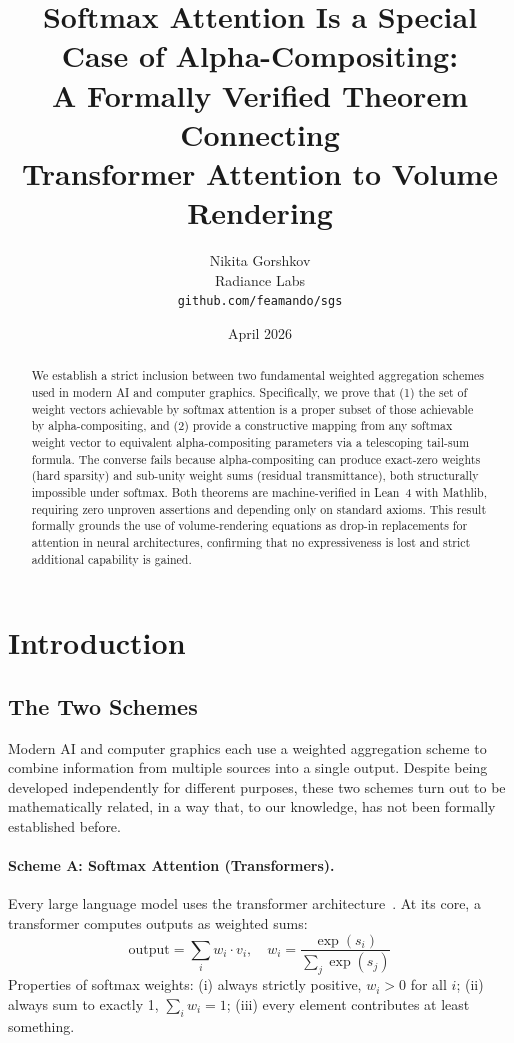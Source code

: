 \documentclass[11pt]{article}
\title{Softmax Attention Is a Special Case of Alpha-Compositing:\\
A Formally Verified Theorem Connecting\\Transformer Attention to Volume Rendering}
\author{Nikita Gorshkov\\Radiance Labs\\
\texttt{github.com/feamando/sgs}}
\date{April 2026}
\begin{document}
\maketitle

\begin{abstract}
We establish a strict inclusion between two fundamental weighted aggregation schemes used in modern AI and computer graphics. Specifically, we prove that (1) the set of weight vectors achievable by softmax attention is a proper subset of those achievable by alpha-compositing, and (2) provide a constructive mapping from any softmax weight vector to equivalent alpha-compositing parameters via a telescoping tail-sum formula. The converse fails because alpha-compositing can produce exact-zero weights (hard sparsity) and sub-unity weight sums (residual transmittance), both structurally impossible under softmax. Both theorems are machine-verified in Lean~4 with Mathlib, requiring zero unproven assertions and depending only on standard axioms. This result formally grounds the use of volume-rendering equations as drop-in replacements for attention in neural architectures, confirming that no expressiveness is lost and strict additional capability is gained.
\end{abstract}

\section{Introduction}

\subsection{The Two Schemes}

Modern AI and computer graphics each use a weighted aggregation scheme to combine information from multiple sources into a single output. Despite being developed independently for different purposes, these two schemes turn out to be mathematically related, in a way that, to our knowledge, has not been formally established before.

\paragraph{Scheme A: Softmax Attention (Transformers).}
Every large language model uses the transformer architecture~\cite{vaswani2017}. At its core, a transformer computes outputs as weighted sums:
\begin{equation}
\text{output} = \sum_i w_i \cdot v_i, \quad w_i = \frac{\exp(s_i)}{\sum_j \exp(s_j)}
\end{equation}
Properties of softmax weights: (i) always strictly positive, $w_i > 0$ for all $i$; (ii) always sum to exactly 1, $\sum_i w_i = 1$; (iii) every element contributes at least something.
\end{document}
